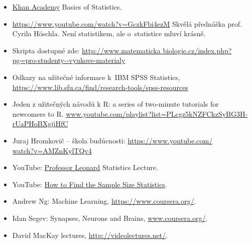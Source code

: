 \begin{itemize}
\itemsep=-2pt
\item \href{https://www.khanacademy.org/math/statistics-probability}{Khan Academy} Basics of Statistics.
\malskok

\item \href{https://www.youtube.com/watch?v=GczkFbi4ezM}{\url{https://www.youtube.com/watch?v=GczkFbi4ezM}} Skvělá přednáška prof. Cyrila Höschla. Není statistikem, ale o~statistice mluví krásně.%
\malskok

\item Skripta  dostupné zde: \href{http://www.matematickabiologie.cz/index.php?pg=pro-studenty--vyukove-materialy}{\url{http://www.matematicka} \url{biologie.cz/index.php?pg=pro-studenty--vyukove-materialy}}
\malskok

\item Odkazy na užitečné informace k~IBM SPSS Statistics,
\href{https://www.lib.sfu.ca/find/research-tools/spss-resources}{\url{https://www.lib.sfu.ca/find/research-tools/spss-resources}}
\item Jeden z užitečných návodů k R:  a series of two-minute tutorials for newcomers to R.
\href{https://www.youtube.com/playlist?list=PLcgz5kNZFCkzSyBG3H-rUaPHoBXgijHfC}{\small\url{www.youtube.com/playlist?list=PLcgz5kNZFCkzSyBG3H-rUaPHoBXgijHfC}}
\malskok

\item Juraj Hromkovič -- škola budúcnosti: \href{https://www.youtube.com/watch?v=AMZnKylTQv4}{\url{https://www.youtube.com/}}\\ \href{https://www.youtube.com/watch?v=AMZnKylTQv4}{\url{watch?v=AMZnKylTQv4}}
\item YouTube: \href{https://www.youtube.com/user/professorleonard57}{Professor Leonard} Statistics Lecture.
\item YouTube: \href{https://www.youtube.com/results?search_query=How+to+Find+the+Sample+Size+Statistics}{How to Find the Sample Size Statistics}.
\malskok

\item Andrew Ng: Machine Learning, \href{https://www.coursera.org/}{\url{https://www.coursera.org/}}.
\item Idan Segev: Synapses, Neurons and Brains, \href{https://www.coursera.org/}{\url{www.coursera.org/}}.
\item David MacKay lectures, \href{http://videolectures.net/}{\url{http://videolectures.net/}}.
\malskok


\end{itemize}
